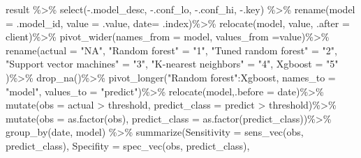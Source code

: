 \documentclass[
]{article}
\newenvironment{Shaded}{\begin{snugshade}}{\end{snugshade}}
\newcommand{\AttributeTok}[1]{\textcolor[rgb]{0.77,0.63,0.00}{#1}}
\newcommand{\FunctionTok}[1]{\textcolor[rgb]{0.00,0.00,0.00}{#1}}
\newcommand{\NormalTok}[1]{#1}
\newcommand{\OtherTok}[1]{\textcolor[rgb]{0.56,0.35,0.01}{#1}}
\newcommand{\SpecialCharTok}[1]{\textcolor[rgb]{0.00,0.00,0.00}{#1}}
\newcommand{\StringTok}[1]{\textcolor[rgb]{0.31,0.60,0.02}{#1}}
\begin{document}
\begin{Shaded}
\begin{Highlighting}[]
\NormalTok{result }\SpecialCharTok{\%\textgreater{}\%}
  \FunctionTok{select}\NormalTok{(}\SpecialCharTok{{-}}\NormalTok{.model\_desc, }\SpecialCharTok{{-}}\NormalTok{.conf\_lo, }\SpecialCharTok{{-}}\NormalTok{.conf\_hi, }\SpecialCharTok{{-}}\NormalTok{.key) }\SpecialCharTok{\%\textgreater{}\%}
  \FunctionTok{rename}\NormalTok{(}\AttributeTok{model =}\NormalTok{ .model\_id, }\AttributeTok{value =}\NormalTok{ .value, }\AttributeTok{date=}\NormalTok{ .index)}\SpecialCharTok{\%\textgreater{}\%}
  \FunctionTok{relocate}\NormalTok{(model, value, }\AttributeTok{.after =}\NormalTok{ client)}\SpecialCharTok{\%\textgreater{}\%}
  \FunctionTok{pivot\_wider}\NormalTok{(}\AttributeTok{names\_from =}\NormalTok{ model, }\AttributeTok{values\_from =}\NormalTok{value)}\SpecialCharTok{\%\textgreater{}\%}
  \FunctionTok{rename}\NormalTok{(}\AttributeTok{actual =} \StringTok{"NA"}\NormalTok{, }\StringTok{"Random forest"} \OtherTok{=} \StringTok{"1"}\NormalTok{, }\StringTok{"Tuned random forest"} \OtherTok{=} \StringTok{"2"}\NormalTok{, }
      \StringTok{"Support vector machines"} \OtherTok{=} \StringTok{"3"}\NormalTok{, }\StringTok{"K{-}nearest neighbors"} \OtherTok{=} \StringTok{"4"}\NormalTok{, }\AttributeTok{Xgboost =} \StringTok{"5"}\NormalTok{ )}\SpecialCharTok{\%\textgreater{}\%}
  \FunctionTok{drop\_na}\NormalTok{()}\SpecialCharTok{\%\textgreater{}\%}
  \FunctionTok{pivot\_longer}\NormalTok{(}\StringTok{"Random forest"}\SpecialCharTok{:}\NormalTok{Xgboost, }\AttributeTok{names\_to =} \StringTok{"model"}\NormalTok{, }\AttributeTok{values\_to =} \StringTok{"predict"}\NormalTok{)}\SpecialCharTok{\%\textgreater{}\%}
  \FunctionTok{relocate}\NormalTok{(model,}\AttributeTok{.before =}\NormalTok{ date)}\SpecialCharTok{\%\textgreater{}\%}
  \FunctionTok{mutate}\NormalTok{(}\AttributeTok{obs =}\NormalTok{ actual }\SpecialCharTok{\textgreater{}}\NormalTok{ threshold, }\AttributeTok{predict\_class =}\NormalTok{ predict }\SpecialCharTok{\textgreater{}}\NormalTok{ threshold)}\SpecialCharTok{\%\textgreater{}\%}
  \FunctionTok{mutate}\NormalTok{(}\AttributeTok{obs =} \FunctionTok{as.factor}\NormalTok{(obs), }\AttributeTok{predict\_class =} \FunctionTok{as.factor}\NormalTok{(predict\_class))}\SpecialCharTok{\%\textgreater{}\%}
  \FunctionTok{group\_by}\NormalTok{(date, model) }\SpecialCharTok{\%\textgreater{}\%}
  \FunctionTok{summarize}\NormalTok{(}\AttributeTok{Sensitivity =} \FunctionTok{sens\_vec}\NormalTok{(obs, predict\_class),}
            \AttributeTok{Specifity =} \FunctionTok{spec\_vec}\NormalTok{(obs, predict\_class),}

\end{Highlighting}
\end{Shaded}
\end{document}

